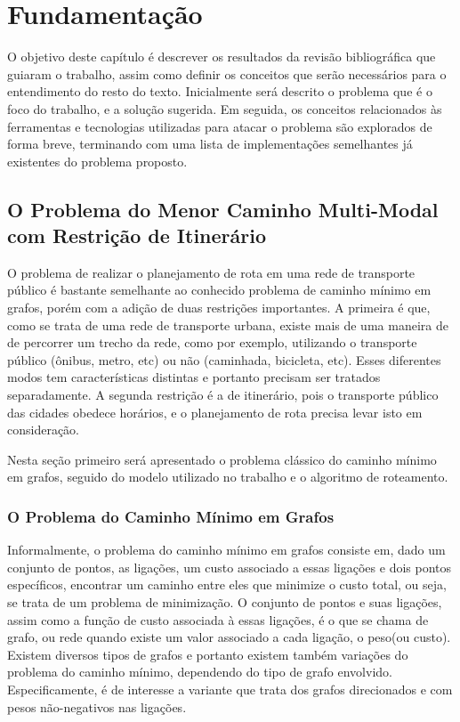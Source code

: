
\chapter{Fundamentação}
\label{fund}

O objetivo deste capítulo é descrever os resultados da revisão bibliográfica que guiaram o trabalho, assim como definir os conceitos que serão necessários para o entendimento do resto do texto. Inicialmente será descrito o problema que é o foco do trabalho, e a solução sugerida. Em seguida, os conceitos relacionados às ferramentas e tecnologias utilizadas para atacar o problema são explorados de forma breve, terminando com uma lista de implementações semelhantes já existentes do problema proposto.

\section{O Problema do Menor Caminho Multi-Modal com Restrição de Itinerário}

O problema de realizar o planejamento de rota em uma rede de transporte público é bastante semelhante ao conhecido problema de caminho mínimo em grafos, porém com a adição de duas restrições importantes.
A primeira é que, como se trata de uma rede de transporte urbana, existe mais de uma maneira de de percorrer um trecho da rede, como por exemplo, utilizando o transporte público (ônibus, metro, etc) ou não (caminhada, bicicleta, etc).
Esses diferentes modos tem características distintas e portanto precisam ser tratados separadamente.
A segunda restrição é a de itinerário, pois o transporte público das cidades obedece horários, e o planejamento de rota precisa levar isto em consideração.

Nesta seção primeiro será apresentado o problema clássico do caminho mínimo em grafos, seguido do modelo utilizado no trabalho e o algoritmo de roteamento.

\subsection{O Problema do Caminho Mínimo em Grafos}

Informalmente, o problema do caminho mínimo em grafos consiste em, dado um conjunto de pontos, as ligações, um custo associado a essas ligações e dois pontos específicos, encontrar um caminho entre eles que minimize o custo total, ou seja, se trata de um problema de minimização.
O conjunto de pontos e suas ligações, assim como a função de custo associada à essas ligações, é o que se chama de grafo, ou rede quando existe um valor associado a cada ligação, o peso(ou custo).
Existem diversos tipos de grafos e portanto existem também variações do problema do caminho mínimo, dependendo do tipo de grafo envolvido.
Especificamente, é de interesse a variante que trata dos grafos direcionados e com pesos não-negativos nas ligações.


